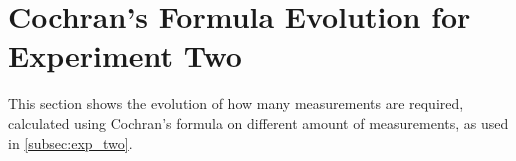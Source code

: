 \section{Cochran's Formula Evolution for Experiment Two}\label{app:cockh_exp}

This section shows the evolution of how many measurements are required, calculated using Cochran's formula on different amount of measurements, as used in \cref{subsec:exp_two}.


